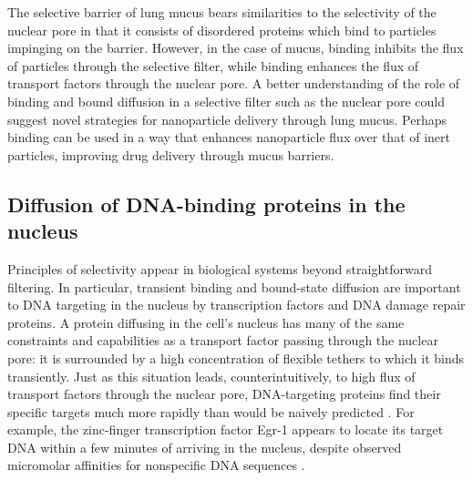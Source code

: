 The selective barrier of lung mucus bears similarities to the selectivity of the nuclear pore in that it consists of disordered proteins which bind to particles impinging on the barrier.  However, in the case of mucus, binding inhibits the flux of particles through the selective filter, while binding enhances the flux of transport factors through the nuclear pore.  A better understanding of the role of binding and bound diffusion in a selective filter such as the nuclear pore could suggest novel strategies for nanoparticle delivery through lung mucus.  Perhaps binding can be used in a way that enhances nanoparticle flux over that of inert particles, improving drug delivery through mucus barriers.

\subsection{Diffusion of DNA-binding proteins in the nucleus}
\label{sec:DNA-diffusion}

Principles of selectivity appear in biological systems beyond straightforward filtering.  In particular, transient binding and bound-state diffusion are important to DNA targeting in the nucleus by transcription factors and DNA damage repair proteins.  A protein diffusing in the cell's nucleus has many of the same constraints and capabilities as a transport factor passing through the nuclear pore: it is surrounded by a high concentration of flexible tethers to which it binds transiently.  Just as this situation leads, counterintuitively, to high flux of transport factors through the nuclear pore, DNA-targeting proteins find their specific targets much more rapidly than would be naively predicted \cite{mirny09}.  For example, the zinc-finger transcription factor Egr-1 appears to locate its target DNA within a few minutes of arriving in the nucleus, despite observed micromolar affinities for nonspecific DNA sequences \cite{iwahara13}.


